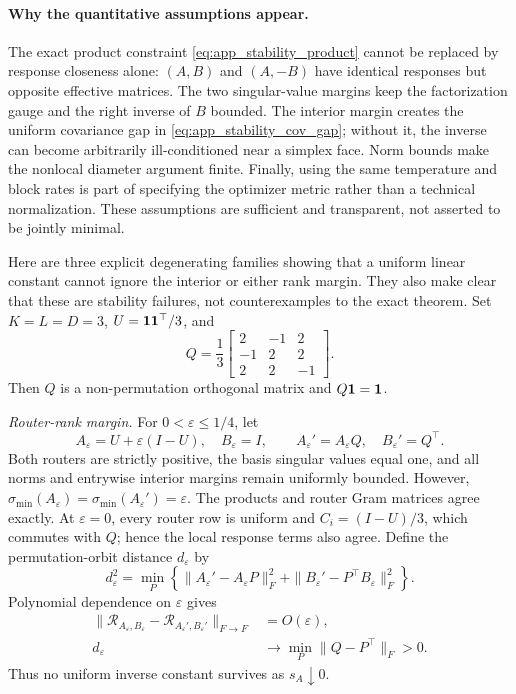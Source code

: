 \paragraph{Why the quantitative assumptions appear.}
The exact product constraint \eqref{eq:app_stability_product} cannot be
replaced by response closeness alone: \((A,B)\) and \((A,-B)\) have identical
responses but opposite effective matrices.  The two singular-value margins
keep the factorization gauge and the right inverse of \(B\) bounded.  The
interior margin creates the uniform covariance gap in
\eqref{eq:app_stability_cov_gap}; without it, the inverse can become
arbitrarily ill-conditioned near a simplex face.  Norm bounds make the
nonlocal diameter argument finite.  Finally, using the same temperature and
block rates is part of specifying the optimizer metric rather than a
technical normalization.  These assumptions are sufficient and transparent,
not asserted to be jointly minimal.

Here are three explicit degenerating families showing that a uniform linear
constant cannot ignore the interior or either rank margin.  They also make
clear that these are stability failures, not counterexamples to the exact
theorem.  Set \(K=L=D=3\), \(U=\mathbf{1}\mathbf{1}^\top/3\), and
\begin{equation}
 Q=\frac13
 \begin{bmatrix}
  2&-1&2\\[-1mm]
  -1&2&2\\[-1mm]
  2&2&-1
 \end{bmatrix}.
 \label{eq:app_stability_fixed_Q}
\end{equation}
Then \(Q\) is a non-permutation orthogonal matrix and \(Q\mathbf{1}=\mathbf{1}\).

\emph{Router-rank margin.}
For \(0<\varepsilon\le1/4\), let
\[
 A_\varepsilon=U+\varepsilon(I-U),\quad B_\varepsilon=I,\qquad
 A_\varepsilon'=A_\varepsilon Q,\quad B_\varepsilon'=Q^\top .
\]
Both routers are strictly positive, the basis singular values equal one, and
all norms and entrywise interior margins remain uniformly bounded.  However,
\(\sigma_{\min}(A_\varepsilon)=
\sigma_{\min}(A_\varepsilon')=\varepsilon\).
The products and router Gram matrices agree exactly.  At
\(\varepsilon=0\), every router row is uniform and
\(C_i=(I-U)/3\), which commutes with \(Q\); hence the local response terms
also agree.  Define the permutation-orbit distance \(d_\varepsilon\) by
\[
 d_\varepsilon^2
 =\min_P\left\{
   \|A_\varepsilon'-A_\varepsilon P\|_F^2+
   \|B_\varepsilon'-P^\top B_\varepsilon\|_F^2\right\}.
\]
Polynomial dependence on \(\varepsilon\) gives
\begin{align}
 \|\mathcal R_{A_\varepsilon,B_\varepsilon}
       -\mathcal R_{A_\varepsilon',B_\varepsilon'}\|_{F\to F}
 &=O(\varepsilon),\\
 d_\varepsilon&\longrightarrow \min_P\|Q-P^\top\|_F>0.
\end{align}
Thus no uniform inverse constant survives as \(s_A\downarrow0\).

